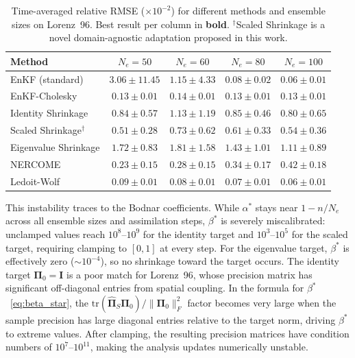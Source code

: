 \begin{table}[t]
\centering
\caption{Time-averaged relative RMSE ($\times 10^{-2}$) for different methods and ensemble sizes on Lorenz~96. Best result per column in \textbf{bold}. $^\dagger$Scaled Shrinkage is a novel domain-agnostic adaptation proposed in this work.}
\label{tab:performance}
\begin{tabular}{@{}lcccc@{}}
\toprule
Method & $N_e = 50$ & $N_e = 60$ & $N_e = 80$ & $N_e = 100$ \\
\midrule
EnKF (standard)          & $3.06 \pm 11.45$ & $1.15 \pm 4.33$ & $0.08 \pm 0.02$ & $\mathbf{0.06 \pm 0.01}$ \\
EnKF-Cholesky            & $0.13 \pm 0.01$ & $0.14 \pm 0.01$ & $0.13 \pm 0.01$ & $0.13 \pm 0.01$ \\
Identity Shrinkage       & $0.84 \pm 0.57$ & $1.13 \pm 1.19$ & $0.85 \pm 0.46$ & $0.80 \pm 0.65$ \\
Scaled Shrinkage$^\dagger$ & $0.51 \pm 0.28$ & $0.73 \pm 0.62$ & $0.61 \pm 0.33$ & $0.54 \pm 0.36$ \\
Eigenvalue Shrinkage     & $1.72 \pm 0.83$ & $1.81 \pm 1.58$  & $1.43 \pm 1.01$ & $1.11 \pm 0.89$ \\
NERCOME                  & $0.23 \pm 0.15$ & $0.28 \pm 0.15$  & $0.34 \pm 0.17$ & $0.42 \pm 0.18$ \\
Ledoit-Wolf              & $\mathbf{0.09 \pm 0.01}$ & $\mathbf{0.08 \pm 0.01}$ & $\mathbf{0.07 \pm 0.01}$ & $0.06 \pm 0.01$ \\
\bottomrule
\end{tabular}
\end{table}

This instability traces to the Bodnar coefficients. While $\alpha^*$ stays near $1 - n/N_e$ across all ensemble sizes and assimilation steps, $\beta^*$ is severely miscalibrated: unclamped values reach $10^8$--$10^9$ for the identity target and $10^3$--$10^5$ for the scaled target, requiring clamping to $[0,1]$ at every step. For the eigenvalue target, $\beta^*$ is effectively zero ($\sim 10^{-4}$), so no shrinkage toward the target occurs. The identity target $\boldsymbol{\Pi}_0 = \mathbf{I}$ is a poor match for Lorenz~96, whose precision matrix has significant off-diagonal entries from spatial coupling. In the formula for $\beta^*$~\eqref{eq:beta_star}, the $\text{tr}(\hat{\boldsymbol{\Pi}}_S \boldsymbol{\Pi}_0) / \|\boldsymbol{\Pi}_0\|_F^2$ factor becomes very large when the sample precision has large diagonal entries relative to the target norm, driving $\beta^*$ to extreme values. After clamping, the resulting precision matrices have condition numbers of $10^7$--$10^{11}$, making the analysis updates numerically unstable.

